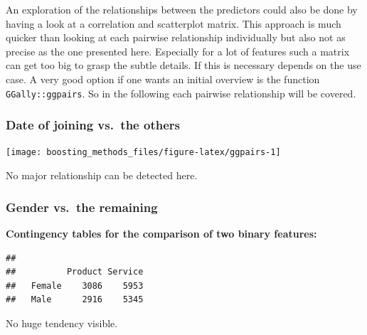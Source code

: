\documentclass[
]{book}
\newenvironment{Shaded}{\begin{snugshade}}{\end{snugshade}}
\newcommand{\CommentTok}[1]{\textcolor[rgb]{0.56,0.35,0.01}{\textit{#1}}}
\newcommand{\FunctionTok}[1]{\textcolor[rgb]{0.00,0.00,0.00}{#1}}
\newcommand{\NormalTok}[1]{#1}
\newcommand{\SpecialCharTok}[1]{\textcolor[rgb]{0.00,0.00,0.00}{#1}}
\begin{document}
An exploration of the relationships between the predictors could also be done by having a look at a correlation and scatterplot matrix. This approach is much quicker than looking at each pairwise relationship individually but also not as precise as the one presented here. Especially for a lot of features such a matrix can get too big to grasp the subtle details. If this is necessary depends on the use case. A very good option if one wants an initial overview is the function \texttt{GGally::ggpairs}. So in the following each pairwise relationship will be covered.

\hypertarget{date-of-joining-vs.-the-others}{%
\subsubsection{Date of joining vs.~the others}\label{date-of-joining-vs.-the-others}}

\texttt{[image: boosting\_methods\_files/figure-latex/ggpairs-1]}

No major relationship can be detected here.

\hypertarget{gender-vs.-the-remaining}{%
\subsubsection{Gender vs.~the remaining}\label{gender-vs.-the-remaining}}

\textbf{Contingency tables for the comparison of two binary features:}

\begin{Shaded}
\end{Shaded}

\begin{verbatim}
##         
##          Product Service
##   Female    3086    5953
##   Male      2916    5345
\end{verbatim}

No huge tendency visible.

\begin{Shaded}
\end{Shaded}
\end{document}
